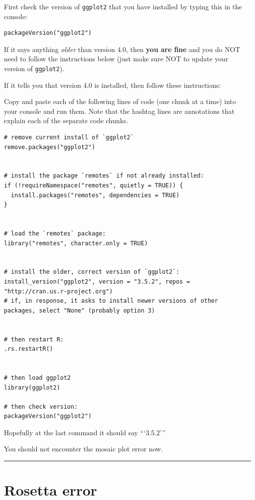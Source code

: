\documentclass[
]{book}
\begin{document}
First check the version of \texttt{ggplot2} that you have installed by typing this in the console:

\begin{verbatim}
packageVersion("ggplot2")
\end{verbatim}

If it says anything \emph{older} than version 4.0, then \textbf{you are fine} and you do NOT need to follow the instructions below (just make sure NOT to update your version of \texttt{ggplot2}).

If it tells you that version 4.0 is installed, then follow these instructions:

Copy and paste each of the following lines of code (one chunk at a time) into your console and run them. Note that the hashtag lines are annotations that explain each of the separate code chunks.

\begin{verbatim}
# remove current install of `ggplot2`
remove.packages("ggplot2")


# install the package `remotes` if not already installed:
if (!requireNamespace("remotes", quietly = TRUE)) {
  install.packages("remotes", dependencies = TRUE)
}


# load the `remotes` package:
library("remotes", character.only = TRUE)


# install the older, correct version of `ggplot2`:
install_version("ggplot2", version = "3.5.2", repos = "http://cran.us.r-project.org")
# if, in response, it asks to install newer versions of other packages, select "None" (probably option 3)


# then restart R:
.rs.restartR()


# then load ggplot2
library(ggplot2)

# then check version:
packageVersion("ggplot2")
\end{verbatim}

Hopefully at the last command it should say ```3.5.2'''

You should not encounter the mosaic plot error now.

\begin{center}\rule{0.5\linewidth}{0.5pt}\end{center}

\section*{Rosetta error}\label{rosetta-error}
\end{document}
